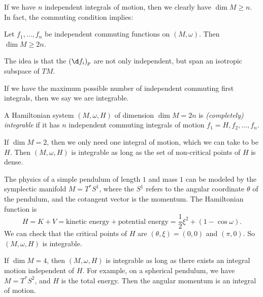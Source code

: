 \documentclass[a4paper]{article}
\begin{document}
If we have $n$ independent integrals of motion, then we clearly have $\dim M \geq n$. In fact, the commuting condition implies:
\begin{ex}
  Let $f_1, \ldots, f_n$ be independent commuting functions on $(M, \omega)$. Then $\dim M \geq 2n$.
\end{ex}
The idea is that the $(\d f_i)_p$ are not only independent, but span an isotropic subspace of $TM$.

If we have the maximum possible number of independent commuting first integrals, then we say we are integrable.
\begin{defi}
  A Hamiltonian system $(M, \omega, H)$ of dimension $\dim M = 2n$ is \emph{(completely) integrable} if it has $n$ independent commuting integrals of motion $f_1 = H, f_2, \ldots, f_n$.
\end{defi}

\begin{eg}
  If $\dim M = 2$, then we only need one integral of motion, which we can take to be $H$. Then $(M, \omega, H)$ is integrable as long as the set of non-critical points of $H$ is dense.
\end{eg}

\begin{eg}
  The physics of a simple pendulum of length $1$ and mass $1$ can be modeled by the symplectic manifold $M = T^*S^1$, where the $S^1$ refers to the angular coordinate $\theta$ of the pendulum, and the cotangent vector is the momentum. The Hamiltonian function is
  \[
    H = K + V = \text{kinetic energy} + \text{potential energy} = \frac{1}{2}\xi^2 + (1 - \cos \omega).
  \]
  We can check that the critical points of $H$ are $(\theta, \xi) = (0, 0)$ and $(\pi, 0)$. So $(M, \omega, H)$ is integrable.
\end{eg}

\begin{eg}
  If $\dim M = 4$, then $(M, \omega, H)$ is integrable as long as there exists an integral motion independent of $H$. For example, on a spherical pendulum, we have $M = T^* S^2$, and $H$ is the total energy. Then the angular momentum is an integral of motion.
\end{eg}
\end{document}
